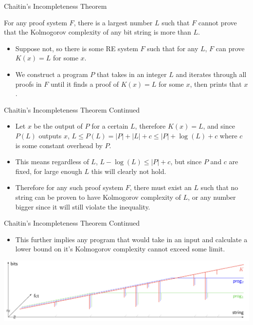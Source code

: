 \documentclass[aspectratio=169]{beamer}
\begin{document}
\begin{frame}{Chaitin's Incompleteness Theorem}
  
  \begin{thrm}
    For any proof system $F$, there is a largest number $L$ such that $F$ cannot prove that the Kolmogorov complexity of any bit string is more than $L$. 
  \end{thrm} \pause
  \begin{itemize}
    \item Suppose not, so there is some RE system $F$ such that for any $L$, $F$ can prove $K(x) = L$ for some $x$. \pause
    \item We construct a program $P$ that takes in an integer $L$ and iterates through all proofs in $F$ until it finds a proof of $K(x) = L$ for some $x$, then prints that $x$.
  \end{itemize}
\end{frame}

\begin{frame}{Chaitin's Incompleteness Theorem Continued}
  
  \begin{itemize}
    \item Let $x$ be the output of $P$ for a certain $L$, therefore $K(x) = L$, and since $P(L)$ outputs $x$, $L \leq P(L) = |P| + |L| + c \leq |P| + \log(L) + c$ where $c$ is some constant overhead by $P$. \pause
    \item This means regardless of $L$, $L - \log(L) \leq |P| + c$, but since $P$ and $c$ are fixed, for large enough $L$ this will clearly not hold. \pause
    \item Therefore for any such proof system $F$, there must exist an $L$ such that no string can be proven to have Kolmogorov complexity of $L$, or any number bigger since it will still violate the inequality. 
  \end{itemize}
\end{frame}

\begin{frame}{Chaitin's Incompleteness Theorem Continued}
  
  \begin{itemize}
    \item This further implies any program that would take in an input and calculate a lower bound on it's Kolmogorov complexity cannot exceed some limit. 
  \end{itemize}
  \begin{center}
    \includegraphics[width=1\textwidth]{K_C_ex.png}
  \end{center}
\end{frame}
\end{document}
